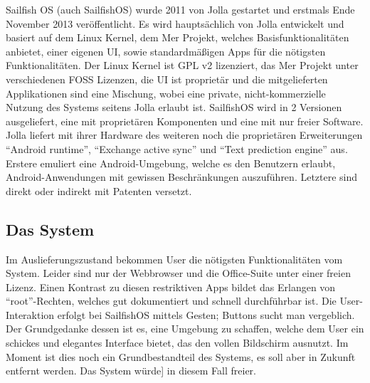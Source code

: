 Sailfish OS (auch \mbox{SailfishOS}) wurde 2011 von Jolla gestartet und erstmals Ende November 2013\thinspace\cite{online:jolla-about} veröffentlicht. Es wird hauptsächlich von Jolla entwickelt und basiert auf dem Linux Kernel, dem Mer Projekt, welches Basisfunktionalitäten anbietet, einer eigenen UI, sowie standardmäßigen Apps für die nötigsten Funktionalitäten\thinspace\cite{online:sailfish-about}. Der Linux Kernel ist GPL v2 lizenziert\thinspace\cite{online:kernel-license}, das Mer Projekt unter verschiedenen FOSS Lizenzen\thinspace\cite{online:mer-license}, die UI ist proprietär und die mitgelieferten Applikationen sind eine Mischung\thinspace\cite{online:sailfish-about}, wobei eine private, \mbox{nicht-kommerzielle} Nutzung des Systems seitens Jolla erlaubt ist\thinspace\cite{online:sailfish-eula}. \mbox{SailfishOS} wird in 2 Versionen ausgeliefert, eine mit proprietären Komponenten und eine mit nur freier Software. Jolla liefert mit ihrer Hardware des weiteren noch die proprietären Erweiterungen\thinspace\cite{online:sailfish-about} ``Android runtime''\thinspace\cite{online:sailfish-android-runtime-licensor}, ``Exchange active sync''\thinspace\cite{online:microsoft-eas} und ``Text prediction engine''\thinspace\cite{online:jolla-xt9}\thinspace\cite{online:xt9-license} aus. Erstere emuliert eine \mbox{Android-Umgebung}, welche es den Benutzern erlaubt, Android-Anwendungen mit gewissen Beschränkungen auszuführen\thinspace\cite{online:sailfish-android-runtime}. Letztere sind direkt oder indirekt mit Patenten versetzt.
\newline

\subsection{Das System}
Im Auslieferungszustand bekommen User die nötigsten Funktionalitäten vom System. Leider sind nur der Webbrowser und die \mbox{Office-Suite} unter einer freien Lizenz\thinspace\cite{online:sailfish-about}. Einen Kontrast zu diesen restriktiven Apps bildet das Erlangen von \mbox{``root''-Rechten}, welches gut dokumentiert und schnell durchführbar ist\thinspace\cite{online:sailfish-root}. Die User-Interaktion erfolgt bei \mbox{SailfishOS} mittels Gesten; Buttons sucht man vergeblich. Der Grundgedanke dessen ist es, eine Umgebung zu schaffen, welche dem User ein schickes und elegantes Interface bietet, das den vollen Bildschirm ausnutzt\thinspace\cite{online:sailfish-ui}. Im Moment ist dies noch ein Grundbestandteil des Systems, es soll aber in Zukunft entfernt werden\thinspace\cite{online:sailfish-about}. Das System würde] in diesem Fall freier.

